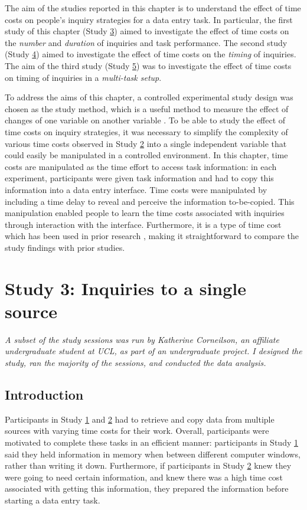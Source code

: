 The aim of the studies reported in this chapter is to understand the effect of time costs on people's inquiry strategies for a data entry task. In particular, the first study of this chapter (Study \hyperref[st:Study3]{3}) aimed to investigate the effect of time costs on the \textit{number} and \textit{duration} of inquiries and task performance. The second study (Study \hyperref[st:Study4]{4}) aimed to investigate the effect of time costs on the \textit{timing} of inquiries. The aim of the third study (Study \hyperref[st:Study5]{5}) was to investigate the effect of time costs on timing of inquiries in a \textit{multi-task setup}.

To address the aims of this chapter, a controlled experimental study design was chosen as the study method, which is a useful method to measure the effect of changes of one variable on another variable \citep{Cairns2008}. To be able to study the effect of time costs on inquiry strategies, it was necessary to simplify the complexity of various time costs observed in Study \hyperref[st:Study2]{2} into a single independent variable that could easily be manipulated in a controlled environment. In this chapter, time costs are manipulated as the time effort to access task information: in each experiment, participants were given task information and had to copy this information into a data entry interface. Time costs were manipulated by including a time delay to reveal and perceive the information to-be-copied. This manipulation enabled people to learn the time costs associated with inquiries through interaction with the interface. Furthermore, it is a type of time cost which has been used in prior research \citep[e.g.][]{Gray2006, Morgan2009}, making it straightforward to compare the study findings with prior studies.

\newpage

\section{Study 3: Inquiries to a single source}\label{st:Study3}

\textit{A subset of the study sessions was run by Katherine Corneilson, an affiliate undergraduate student at UCL, as part of an undergraduate project. I designed the study, ran the majority of the sessions, and conducted the data analysis.}

\subsection{Introduction}
Participants in Study \hyperref[st:Study1]{1} and \hyperref[st:Study2]{2} had to retrieve and copy data from multiple sources with varying time costs for their work. Overall, participants were motivated to complete these tasks in an efficient manner: participants in Study  \hyperref[st:Study1]{1} said they held information in memory when between different computer windows, rather than writing it down. Furthermore, if participants in Study \hyperref[st:Study2]{2} knew they were going to need certain information, and knew there was a high time cost associated with getting this information, they prepared the information before starting a data entry task. 

